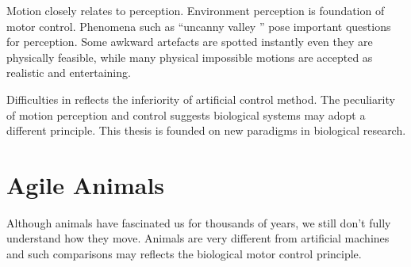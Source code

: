 Motion closely relates to perception.
Environment perception is foundation of motor control.
Phenomena such as  ``uncanny valley '' pose  important questions for perception. 
Some awkward artefacts are spotted instantly even they are physically feasible, while many physical impossible motions are accepted as realistic and entertaining. 



Difficulties in \cms reflects the inferiority of artificial control method.
The peculiarity of motion perception and control suggests  biological systems may adopt a different principle.
This thesis is founded on new paradigms in biological research.

 

\section{Agile Animals}
Although animals have fascinated us for thousands of years, we still don't fully understand how they move.
Animals are very different from artificial machines and such comparisons may reflects the  biological motor control principle.

